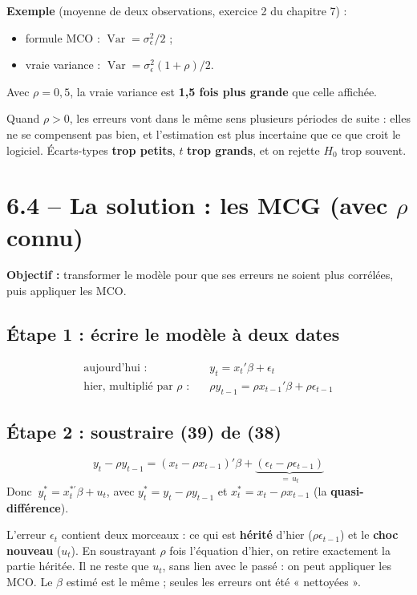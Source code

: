 \documentclass[12pt,a4paper]{article}
\newcommand{\Var}{\operatorname{Var}}\newcommand{\Cov}{\operatorname{Cov}}\newcommand{\E}{\mathbb{E}}
\begin{document}
\textbf{Exemple} (moyenne de deux observations, exercice 2 du chapitre 7) :
\begin{itemize}
\item formule MCO : $\Var=\sigma_\epsilon^2/2$ ;
\item vraie variance : $\Var=\sigma_\epsilon^2(1+\rho)/2$.
\end{itemize}
Avec $\rho=0{,}5$, la vraie variance est \textbf{1,5 fois plus grande} que celle affichée.
\begin{intuition}
Quand $\rho>0$, les erreurs vont dans le même sens plusieurs périodes de suite : elles ne se compensent pas bien, et l'estimation est plus incertaine que ce que croit le logiciel. Écarts-types \textbf{trop petits}, $t$ \textbf{trop grands}, et on rejette $H_0$ trop souvent.
\end{intuition}

\section*{6.4 -- La solution : les MCG (avec $\rho$ connu)}

\textbf{Objectif :} transformer le modèle pour que ses erreurs ne soient plus corrélées, puis appliquer les MCO.

\subsection*{Étape 1 : écrire le modèle à deux dates}
\begin{align*}
\text{aujourd'hui :}\quad & y_t=x_t'\beta+\epsilon_t \tag{38}\\
\text{hier, multiplié par }\rho\text{ :}\quad & \rho y_{t-1}=\rho x_{t-1}'\beta+\rho\epsilon_{t-1} \tag{39}
\end{align*}

\subsection*{Étape 2 : soustraire (39) de (38)}
\[
y_t-\rho y_{t-1}=(x_t-\rho x_{t-1})'\beta+\underbrace{(\epsilon_t-\rho\epsilon_{t-1})}_{=\,u_t}
\]
Donc $\ y_t^*=x_t^{*\prime}\beta+u_t$, avec $y_t^*=y_t-\rho y_{t-1}$ et $x_t^*=x_t-\rho x_{t-1}$ (la \textbf{quasi-différence}).
\begin{intuition}
L'erreur $\epsilon_t$ contient deux morceaux : ce qui est \textbf{hérité} d'hier ($\rho\epsilon_{t-1}$) et le \textbf{choc nouveau} ($u_t$). En soustrayant $\rho$ fois l'équation d'hier, on retire exactement la partie héritée. Il ne reste que $u_t$, sans lien avec le passé : on peut appliquer les MCO. Le $\beta$ estimé est le même ; seules les erreurs ont été « nettoyées ».
\end{intuition}
\end{document}
